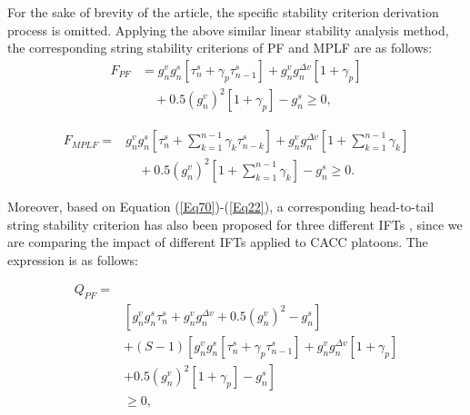 \documentclass[journal]{IEEEtran}
\begin{document}
For the sake of brevity of the article, the specific stability criterion derivation process is omitted. Applying the above similar linear stability analysis method, the corresponding string stability criterions of PF and MPLF are as follows:
\begin{equation}
\begin{aligned}
  F_{PF} 
  &= g_{n}^{v} g_{n}^{s}\left[\tau_{n}^{s}\!+\!\gamma_{p} \tau_{n\!-\!1}^{s}\right]\!+\!g_{n}^{v} g_{n}^{\Delta v}\left[1\!+\!\gamma_{p}\right]\! \\
  &\quad +\!0.5\left(g_{n}^{v}\right)^{2}\left[1\!+\!\gamma_{p}\right]\!-\!g_{n}^{s} \geq 0,
\end{aligned}
\label{Eq21}
\end{equation}


\begin{equation}
\begin{aligned}
  F_{MPLF}=&g_{n}^{v} g_{n}^{s}\left[\tau_{n}^{s}\!+\!\sum_{k=1}^{n\!-\!1} \gamma_{k} \tau_{n\!-\!k}^{s}\right]\!+\!g_{n}^{v} g_{n}^{\Delta v}\left[1\!+\!\sum_{k=1}^{n\!-\!1} \gamma_{k}\right]\\
  &\quad\!+\!0.5\left(g_{n}^{v}\right)^{2}\left[1\!+\!\sum_{k=1}^{n\!-\!1} \gamma_{k}\right]\!-\!g_{n}^{s} \geq 0.
\end{aligned}
\label{Eq22}
\end{equation}


Moreover, based on Equation (\ref{Eq70})-(\ref{Eq22}), a corresponding head-to-tail string stability criterion has also been proposed for three different IFTs \citep{ngoduy2013analytical,2009Heterogeneity}, since we are comparing the impact of different IFTs applied to CACC platoons. The expression is as follows:

\begin{equation}
  \begin{aligned}
    Q_{PF}=\\
    &\left[ g_{n}^{v} g_{n}^{s} \tau_{n}^{s} \!+\!g_{n}^{v} g_{n}^{\Delta v}+0.5\left(g_{n}^{v}\right)^{2}\!-\!g_{n}^{s} \right]\\
    &+\left(S\!-\!1\right) \left[g_{n}^{v} g_{n}^{s}\left[\tau_{n}^{s}\!+\!\gamma_{p} \tau_{n\!-\!1}^{s}\right]\!+\!g_{n}^{v} g_{n}^{\Delta v}\left[1\!+\!\gamma_{p}\right]\! \right.\\
    &\left. +0.5\left(g_{n}^{v}\right)^{2}\left[1\!+\!\gamma_{p}\right]\!-\!g_{n}^{s}\right]\\
    &\geq 0,
  \end{aligned}
  \label{Eq71}
  \end{equation}
\end{document}
